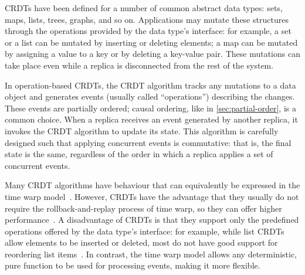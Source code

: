 \documentclass[sigconf,nonacm]{acmart}
\begin{document}
CRDTs have been defined for a number of common abstract data types: sets, maps, lists, trees, graphs, and so on.
Applications may mutate these structures through the operations provided by the data type's interface: for example, a set or a list can be mutated by inserting or deleting elements; a map can be mutated by assigning a value to a key or by deleting a key-value pair.
These mutations can take place even while a replica is disconnected from the rest of the system.

In operation-based CRDTs, the CRDT algorithm tracks any mutations to a data object and generates events (usually called ``operations'') describing the changes.
These events are partially ordered; causal ordering, like in \autoref{sec:partial-order}, is a common choice.
When a replica receives an event generated by another replica, it invokes the CRDT algorithm to update its state.
This algorithm is carefully designed such that applying concurrent events is commutative: that is, the final state is the same, regardless of the order in which a replica applies a set of concurrent events.

Many CRDT algorithms have behaviour that can equivalently be expressed in the time warp model~\cite{Kleppmann:2018}.
However, CRDTs have the advantage that they usually do not require the rollback-and-replay process of time warp, so they can offer higher performance~\cite{dePorre:2019}.
A disadvantage of CRDTs is that they support only the predefined operations offered by the data type's interface: for example, while list CRDTs allow elements to be inserted or deleted, most do not have good support for reordering list items~\cite{Kleppmann:2020}.
In contrast, the time warp model allows any deterministic, pure function to be used for processing events, making it more flexible.


{}
\end{document}
